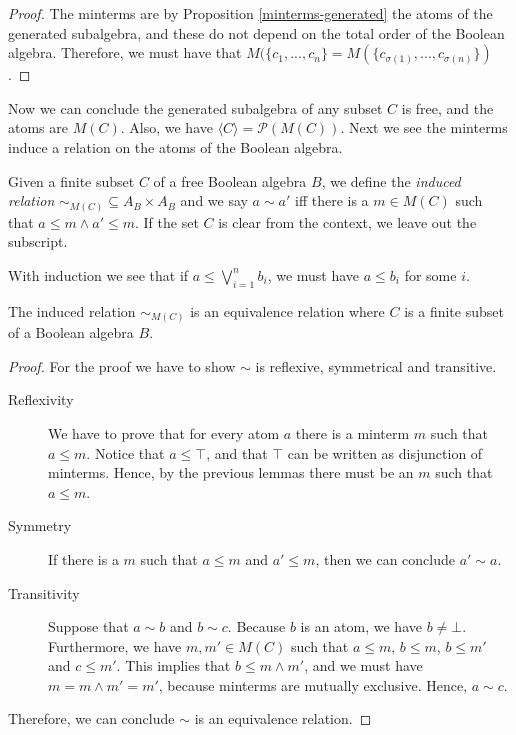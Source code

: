 \begin{proof}
The minterms are by Proposition \ref{minterms-generated} the atoms of the generated subalgebra, and these do not depend on the total order of the Boolean algebra. Therefore, we must have that $M(\{c_1, ..., c_n\} = M(\{c_{\sigma(1)}, ..., c_{\sigma(n)}\})$.
\end{proof}

Now we can conclude the generated subalgebra of any subset $C$ is free, and the atoms are $M(C)$. Also, we have $\langle C \rangle = \mathcal{P}(M(C))$. Next we see the minterms induce a relation on the atoms of the Boolean algebra.

\begin{definition}
Given a finite subset $C$ of a free Boolean algebra $B$, we define the \emph{induced relation} ${\sim}_{M(C)} \subseteq A_B \times A_B$ and we say $a \sim a'$ iff there is a $m \in M(C)$ such that $a \le m\land a' \le m$. If the set $C$ is clear from the context, we leave out the subscript.
\end{definition}

With induction we see that if $a \leq \bigvee_{i=1}^n b_i$, we must have $a \leq b_i$ for some $i$.

\begin{proposition}
The induced relation $\sim_{M(C)}$ is an equivalence relation where $C$ is a finite subset of a Boolean algebra $B$.
\end{proposition}

\begin{proof}
For the proof we have to show ${\sim}$ is reflexive, symmetrical and transitive. 

\begin{description}
\item[Reflexivity] We have to prove that for every atom $a$ there is a minterm $m$ such that $a \leq m$. Notice that $a \leq \top$, and that $\top$ can be written as disjunction of minterms. Hence, by the previous lemmas there must be an $m$ such that $a \leq m$.

\item[Symmetry] If there is a $m$ such that $a \leq m$ and $a' \leq m$, then we can conclude $a' \sim a$. 

\item[Transitivity] Suppose that $a \sim b$ and $b \sim c$. Because $b$ is an atom, we have $b \neq \bot$. Furthermore, we have $m,m'\in M(C)$ such that $a\le m$, $b \le m$, $b \le m'$ and $c \le m'$. This implies that $b \le m \land m'$, and we must have $m = m\land m' = m'$, because minterms are mutually exclusive. Hence, $a \sim c$.
\end{description}
Therefore, we can conclude ${\sim}$ is an equivalence relation.
\end{proof}

